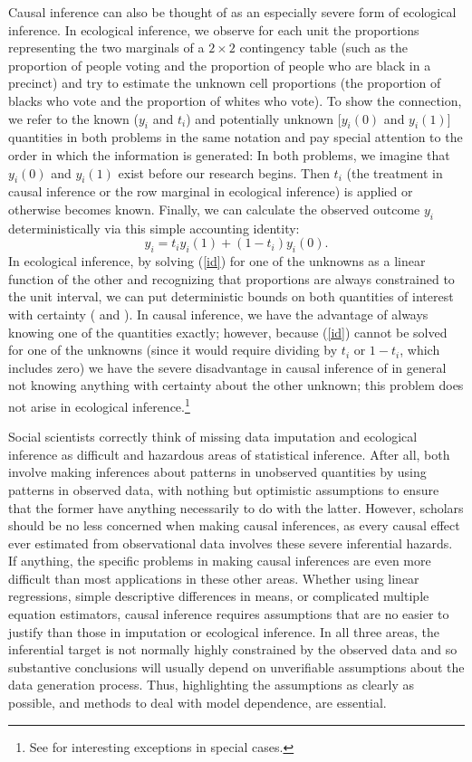 \documentclass[11pt,titlepage]{article}
\begin{document}
Causal inference can also be thought of as an especially severe form
of ecological inference.  In ecological inference, we observe for each
unit the proportions representing the two marginals of a $2\times 2$
contingency table (such as the proportion of people voting and the
proportion of people who are black in a precinct) and try to estimate
the unknown cell proportions (the proportion of blacks who vote and
the proportion of whites who vote).  To show the connection, we refer
to the known ($y_i$ and $t_i$) and potentially unknown [$y_i(0)$ and
$y_i(1)$] quantities in both problems in the same notation and pay
special attention to the order in which the information is generated:
In both problems, we imagine that $y_i(0)$ and $y_i(1)$ exist
before our research begins.  Then $t_i$ (the treatment in
causal inference or the row marginal in ecological inference) is
applied or otherwise becomes known.  Finally, we can calculate the
observed outcome $y_i$ deterministically via this simple accounting
identity:
\begin{equation}
  \label{id}
  y_i = t_iy_i(1) + (1-t_i)y_i(0).
\end{equation}
In ecological inference, by solving (\ref{id}) for one of the unknowns
as a linear function of the other and recognizing that proportions are
always constrained to the unit interval, we can put deterministic
bounds on both quantities of interest with certainty
(\citealp{DunDav53} and \citealp[][ch.5]{King97}).  In causal
inference, we have the advantage of always knowing one of the
quantities exactly; however, because (\ref{id}) cannot be solved for
one of the unknowns (since it would require dividing by $t_i$ or
$1-t_i$, which includes zero) we have the severe disadvantage in
causal inference of in general not knowing anything with certainty
about the other unknown; this problem does not arise in ecological
inference.\footnote{See \citet{Manski95} for interesting exceptions in
  special cases.}

Social scientists correctly think of missing data imputation and
ecological inference as difficult and hazardous areas of statistical
inference.  After all, both involve making inferences about patterns
in unobserved quantities by using patterns in observed data, with
nothing but optimistic assumptions to ensure that the former have
anything necessarily to do with the latter.  However, scholars should
be no less concerned when making causal inferences, as every causal
effect ever estimated from observational data involves these severe
inferential hazards.  If anything, the specific problems in making
causal inferences are even more difficult than most applications in
these other areas.  Whether using linear regressions, simple
descriptive differences in means, or complicated multiple equation
estimators, causal inference requires assumptions that are no easier
to justify than those in imputation or ecological inference.  In all
three areas, the inferential target is not normally highly constrained
by the observed data and so substantive conclusions will usually
depend on unverifiable assumptions about the data generation process.
Thus, highlighting the assumptions as clearly as possible, and methods
to deal with model dependence, are essential.
\end{document}
